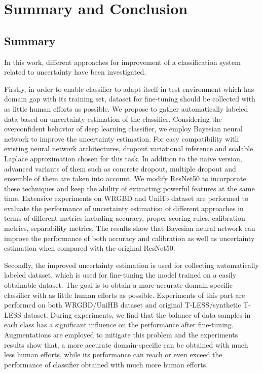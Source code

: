 \chapter{Summary and Conclusion}
\section{Summary}
In this work, different approaches for improvement of a classification system related to uncertainty have been investigated.
 
Firstly, in order to enable classifier to adapt itself in test environment which has domain gap with its training set, dataset for fine-tuning should be collected with as little human efforts as possible. We propose to gather automatically labeled data based on uncertainty estimation of the classifier. Considering the overconfident behavior of deep learning classifier, we employ Bayesian neural network to improve the uncertainty estimation. For easy compatibility with existing neural network architectures, dropout variational inference and scalable Laplace approximation chosen for this task. In addition to the naive version, advanced variants of them such as concrete dropout, multiple dropout and ensemble of them are taken into account. We modify ResNet50 to incorporate these techniques and keep the ability of extracting powerful features at the same time. Extensive experiments on WRGBD and UniHb dataset are performed to evaluate the performance of uncertainty estimation of different approaches in terms of different metrics including accuracy, proper scoring rules, calibration metrics, separability metrics. The results show that Bayesian neural network can improve the performance of both accuracy and calibration as well as uncertainty estimation when compared with the original ResNet50. 

Secondly, the improved uncertainty estimation is used for collecting automatically labeled dataset, which is used for fine-tuning the model trained on a easily obtainable dataset. The goal is to obtain a more accurate domain-specific classifier with as little human efforts as possible. Experiments of this part are performed on both WRGBD/UniHB dataset and original T-LESS/synthetic T-LESS dataset. During experiments, we find that the balance of data samples in each class has a significant influence on the performance after fine-tuning. Augmentations are employed to mitigate this problem and the experiments results show that, a more accurate domain-specific can be obtained with much less human efforts, while its performance can reach or even exceed the performance of classifier obtained with much more human efforts.


